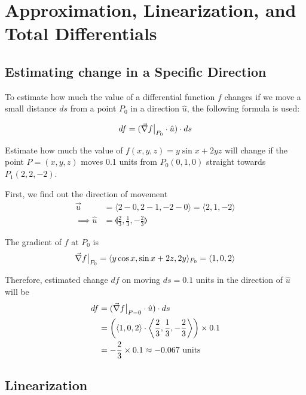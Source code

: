 \section{Approximation, Linearization, and Total Differentials}

\subsection{Estimating change in a Specific Direction}
To estimate how much the value of a differential function $f$ changes if we move a small distance $ds$ from a point $P_0$
in a direction $\hat{u}$, the following formula is used:

\begin{equation}
    df = (\vec{\nabla} f \big|_{P_0} \cdot \hat{u}) \cdot ds
\end{equation}

\begin{example}
    \normalfont Estimate how much the value of $f(x, y, z) = y \sin{x} + 2yz$ will change if the point $P = (x, y, z)$
    moves 0.1 units from $P_0(0, 1, 0)$ straight towards $P_1(2, 2, -2)$.

    First, we find out the direction of movement
    \begin{align*}
        \vec{u} &= \langle 2-0, 2-1, -2-0 \rangle = \langle 2, 1, -2 \rangle \\
        \implies \hat{u} &= \llangle \frac{2}{3}, \frac{1}{3}, -\frac{2}{3} \rrangle
    \end{align*}

    The gradient of $f$ at $P_0$ is
    $$\vec{\nabla} f \big|_{P_0} = \langle y \cos{x}, \sin{x} + 2z, 2y \rangle_{P_0} = \langle 1, 0, 2 \rangle$$

    Therefore, estimated change $df$ on moving $ds = 0.1$ units in the direction of $\hat{u}$ will be
    \begin{align*}
        df &= (\vec{\nabla} f \big|_{P-0} \cdot \hat{u}) \cdot ds \\
        &= \left( \langle 1, 0, 2 \rangle \cdot \left\langle \frac{2}{3}, \frac{1}{3}, -\frac{2}{3} \right\rangle \right) \times 0.1 \\
        &= -\frac{2}{3} \times 0.1 \approx -0.067 \text{ units }
    \end{align*}
\end{example}


\subsection{Linearization}

